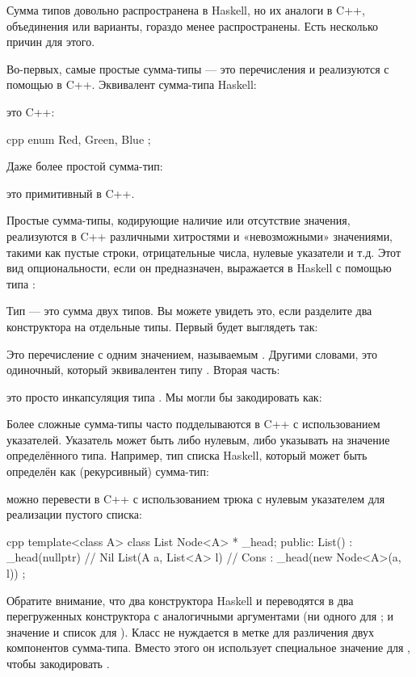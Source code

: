 Сумма типов довольно распространена в Haskell, но их аналоги в C++, объединения или варианты, гораздо менее распространены. Есть несколько причин для этого.

Во-первых, самые простые сумма-типы — это перечисления и реализуются с помощью  в C++. Эквивалент сумма-типа Haskell:

это C++:

\begin{snip}{cpp}
enum { Red, Green, Blue };
\end{snip}
Даже более простой сумма-тип:

это примитивный  в C++.

Простые сумма-типы, кодирующие наличие или отсутствие значения, реализуются в C++ различными хитростями и «невозможными» значениями, такими как пустые строки, отрицательные числа, нулевые указатели и т.д. Этот вид опциональности, если он предназначен, выражается в Haskell с помощью типа :

Тип  — это сумма двух типов. Вы можете увидеть это, если разделите два конструктора на отдельные типы. Первый будет выглядеть так:

Это перечисление с одним значением, называемым . Другими словами, это одиночный, который эквивалентен типу \code{()}. Вторая часть:

это просто инкапсуляция типа . Мы могли бы закодировать  как:

Более сложные сумма-типы часто подделываются в C++ с использованием указателей. Указатель может быть либо нулевым, либо указывать на значение определённого типа. Например, тип списка Haskell, который может быть определён как (рекурсивный) сумма-тип:

можно перевести в C++ с использованием трюка с нулевым указателем для реализации пустого списка:

\begin{snip}{cpp}
template<class A>
class List {
    Node<A> * _head;
public:
    List() : _head(nullptr) {} // Nil
    List(A a, List<A> l)       // Cons
      : _head(new Node<A>(a, l))
    {}
};
\end{snip}
Обратите внимание, что два конструктора Haskell  и  переводятся в два перегруженных конструктора  с аналогичными аргументами (ни одного для ; и значение и список для ). Класс  не нуждается в метке для различения двух компонентов сумма-типа. Вместо этого он использует специальное значение  для , чтобы закодировать .

